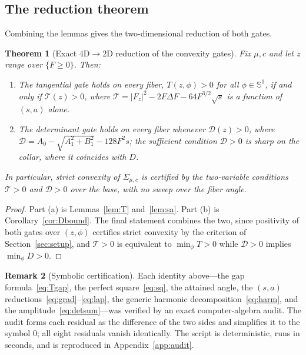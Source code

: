 \documentclass[11pt,reqno]{amsart}
\theoremstyle{plain}
\newtheorem{theorem}{Theorem}[section]
\theoremstyle{definition}
\newtheorem{remark}[theorem]{Remark}
\newcommand{\Sph}{\mathbb{S}}
\newcommand{\calT}{\mathcal{T}}
\newcommand{\calD}{\mathcal{D}}
\newcommand{\Fz}{F_{z}}
\begin{document}
\subsection{The reduction theorem}

Combining the lemmas gives the two-dimensional reduction of both gates.

\begin{theorem}[Exact $4\mathrm{D}\to2\mathrm{D}$ reduction of the convexity gates]\label{thm:reduction}
Fix $\mu,c$ and let $z$ range over $\{F\ge 0\}$. Then:
\begin{enumerate}
\item[(a)] The tangential gate holds on every fiber, $T(z,\phi)>0$ for all $\phi\in\Sph^1$, if and only if $\calT(z)>0$, where $\calT=|\Fz|^2-2F\Delta F-64F^{3/2}\sqrt s$ is a function of $(s,a)$ alone.
\item[(b)] The determinant gate holds on every fiber whenever $\calD(z)>0$, where $\calD=A_0-\sqrt{A_1^2+B_1^2}-128F^2s$; the sufficient condition $\calD>0$ is sharp on the collar, where it coincides with $D$.
\end{enumerate}
In particular, strict convexity of $\Sigma_{\mu,c}$ is certified by the two-variable conditions $\calT>0$ and $\calD>0$ over the base, with no sweep over the fiber angle.
\end{theorem}

\begin{proof}
Part (a) is Lemmas~\ref{lem:T} and~\ref{lem:sa}. Part (b) is Corollary~\ref{cor:Dbound}. The final statement combines the two, since positivity of both gates over $(z,\phi)$ certifies strict convexity by the criterion of Section~\ref{sec:setup}, and $\calT>0$ is equivalent to $\min_\phi T>0$ while $\calD>0$ implies $\min_\phi D>0$.
\end{proof}

\begin{remark}[Symbolic certification]\label{rem:audit}
Each identity above---the gap formula~\eqref{eq:Tgap}, the perfect square~\eqref{eq:sq}, the attained angle, the $(s,a)$ reductions~\eqref{eq:grad}--\eqref{eq:lap}, the generic harmonic decomposition~\eqref{eq:harm}, and the amplitude~\eqref{eq:detsum}---was verified by an exact computer-algebra audit. The audit forms each residual as the difference of the two sides and simplifies it to the symbol $0$; all eight residuals vanish identically. The script is deterministic, runs in seconds, and is reproduced in Appendix~\ref{app:audit}.
\end{remark}
\end{document}
